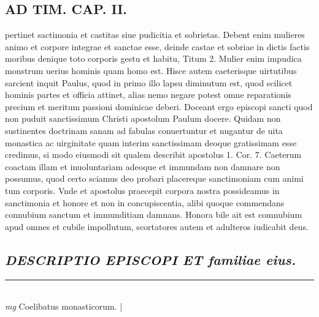 \documentclass{article}
\begin{document}
\begin{pages}
\section*{AD TIM. CAP. II. }
\marginpar{[ p.122 ]}\pstart pertinet sactimonia et castitas siue pudicitia et sobrietas. Debent enim mulieres animo et corpore integrae et sanctae esse, deinde castae et sobriae in dictis factis moribus denique toto corporis gestu et habitu, Titum 2. Mulier enim impudica monstrum uerius hominis quam homo est. Hisce autem caeterisque uirtutibus sarcient inquit Paulus, quod in primo illo lapsu diminutum est, quod scilicet hominis partes et officia attinet, alias nemo negare potest omne reparationis precium et meritum passioni dominicae deberi. Doceant ergo episcopi sancti quod non puduit sanctissimum Christi apostolum Paulum docere. Quidam non sustinentes doctrinam sanam ad fabulas conuertuntur et nugantur de uita monastica ac uirginitate quam interim sanctissimam deoque gratissimam esse credimus, si modo eiusmodi sit qualem describit apostolus 1. Cor. 7. Caeterum coactam illam et inuoluntariam adeoque et immundam non damnare non possumus, quod certo sciamus deo probari placereque sanctimoniam cum animi tum corporis. Vnde et apostolus praecepit corpora nostra possideamus in sanctimonia et honore et non in concupiscentia, alibi quoque commendans connubium sanctum et immunditiam damnans. Honora bile ait est comnubium apud omnes et cubile impollutum, scortatores autem et adulteros iudicabit deus.  \pend
{}
{}
\subsection*{\textit{DESCRIPTIO EPISCOPI ET familiae eius. }}
\vspace{0.5cm}\noindent
\vspace{0.2cm}\rule{1cm}{0.2pt}\\ 
\hspace{0.2cm}\textit{mg}
\footnotesize Coelibatus monasticorum. 
\normalsize| 

\end{pages}
\end{document}
